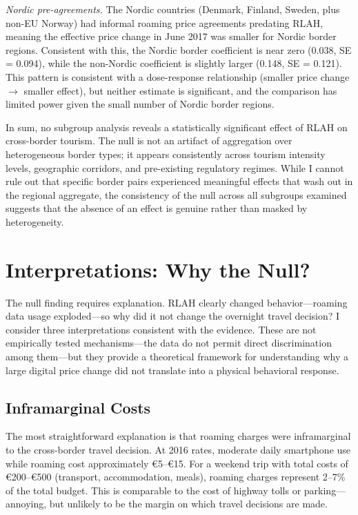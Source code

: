 \documentclass[12pt]{article}
\newcommand{\EUR}[1]{\euro#1}
\begin{document}
\textit{Nordic pre-agreements.} The Nordic countries (Denmark, Finland, Sweden, plus non-EU Norway) had informal roaming price agreements predating RLAH, meaning the effective price change in June 2017 was smaller for Nordic border regions. Consistent with this, the Nordic border coefficient is near zero (0.038, SE = 0.094), while the non-Nordic coefficient is slightly larger (0.148, SE = 0.121). This pattern is consistent with a dose-response relationship (smaller price change $\rightarrow$ smaller effect), but neither estimate is significant, and the comparison has limited power given the small number of Nordic border regions.

In sum, no subgroup analysis reveals a statistically significant effect of RLAH on cross-border tourism. The null is not an artifact of aggregation over heterogeneous border types; it appears consistently across tourism intensity levels, geographic corridors, and pre-existing regulatory regimes. While I cannot rule out that specific border pairs experienced meaningful effects that wash out in the regional aggregate, the consistency of the null across all subgroups examined suggests that the absence of an effect is genuine rather than masked by heterogeneity.


\section{Interpretations: Why the Null?}

The null finding requires explanation. RLAH clearly changed behavior---roaming data usage exploded---so why did it not change the overnight travel decision? I consider three interpretations consistent with the evidence. These are not empirically tested mechanisms---the data do not permit direct discrimination among them---but they provide a theoretical framework for understanding why a large digital price change did not translate into a physical behavioral response.

\subsection{Inframarginal Costs}

The most straightforward explanation is that roaming charges were inframarginal to the cross-border travel decision. At 2016 rates, moderate daily smartphone use while roaming cost approximately \EUR{5}--\EUR{15}. For a weekend trip with total costs of \EUR{200}--\EUR{500} (transport, accommodation, meals), roaming charges represent 2--7\% of the total budget. This is comparable to the cost of highway tolls or parking---annoying, but unlikely to be the margin on which travel decisions are made.
\end{document}
